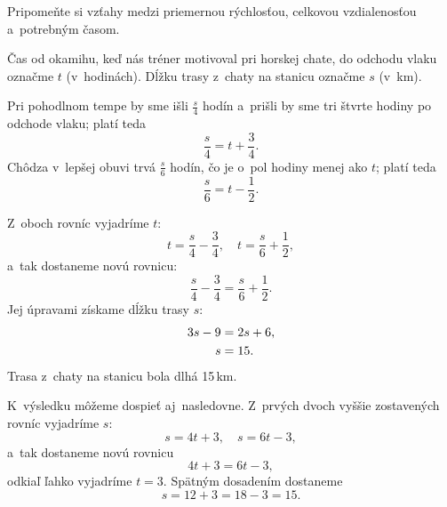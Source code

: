 {%
\napad
Pripomeňte si vzťahy medzi priemernou rýchlosťou, celkovou vzdialenosťou
a~potrebným časom.

\res
Čas od okamihu, keď nás tréner motivoval pri horskej chate,
do odchodu vlaku označme $t$ (v~hodinách).
Dĺžku trasy z~chaty na stanicu označme $s$ (v~km).

Pri pohodlnom tempe by sme išli $\frac{s}4$ hodín a~prišli by sme
tri štvrte hodiny po odchode vlaku; platí teda
$$
\frac{s}4=t+\frac34.
$$
Chôdza v~lepšej obuvi trvá $\frac{s}6$ hodín, čo je o~pol hodiny menej ako $t$; platí
teda
$$
\frac{s}6=t-\frac12.
$$

Z~oboch rovníc vyjadríme $t$:
$$
t=\frac{s}4-\frac34,\quad t=\frac{s}6+\frac12,
$$
a~tak dostaneme novú rovnicu:
$$
\frac{s}4-\frac34=\frac{s}6+\frac12.
$$
Jej úpravami získame dĺžku trasy $s$:
$$
\aligned
3s-9&=2s+6,\\
s&=15.
\endaligned
$$
Trasa z~chaty na stanicu bola dlhá 15\,km.

\poznamka
K~výsledku môžeme dospieť aj~nasledovne.
Z~prvých dvoch vyššie zostavených rovníc vyjadríme $s$:
$$
s=4t+3,\quad s=6t-3,
$$
a~tak dostaneme novú rovnicu
$$
4t+3=6t-3,
$$
odkiaľ ľahko vyjadríme $t=3$.
Spätným dosadením dostaneme
$$
s=12+3=18-3=15.
$$}

